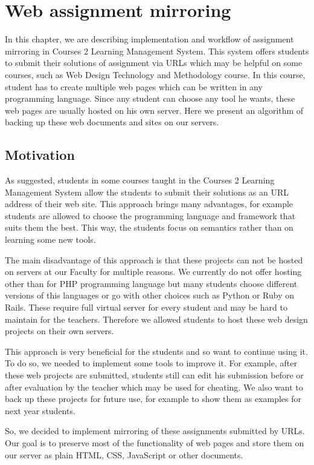 \chapter{Web assignment mirroring}
\label{sec:mirroring}

In this chapter, we are describing implementation and workflow of assignment mirroring in Courses 2 Learning Management System. This system offers students to submit their solutions of assignment via URLs which may be helpful on some courses, such as Web Design Technology and Methodology course. In this course, student has to create multiple web pages which can be written in any programming language. Since any student can choose any tool he wants, these web pages are usually hosted on his own server. Here we present an algorithm of backing up these web documents and sites on our servers.

\section{Motivation}
As suggested, students in some courses taught in the Courses 2 Learning Management System allow the students to submit their solutions as an URL address of their web site. This approach brings many advantages, for example students are allowed to choose the programming language and framework that suits them the best. This way, the students focus on semantics rather than on learning some new tools.

The main disadvantage of this approach is that these projects can not be hosted on servers at our Faculty for multiple reasons. We currently do not offer hosting other than for PHP programming language but many students choose different versions of this languages or go with other choices such as Python or Ruby on Rails. These require full virtual server for every student and may be hard to maintain for the teachers. Therefore we allowed students to host these web design projects on their own servers.

This approach is very beneficial for the students and so want to continue using it. To do so, we needed to implement some tools to improve it. For example, after these web projects are submitted, students still can edit his submission before or after evaluation by the teacher which may be used for cheating. We also want to back up these projects for future use, for example to show them as examples for next year students.

So, we decided to implement mirroring of these assignments submitted by URLs. Our goal is to preserve most of the functionality of web pages and store them on our server as plain HTML, CSS, JavaScript or other documents. 

